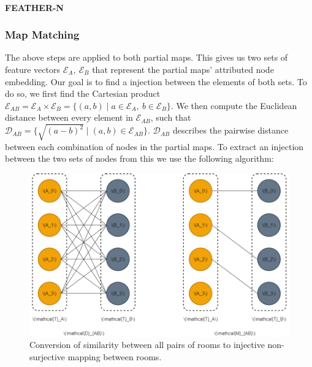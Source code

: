 \paragraph{FEATHER-N}

\subsubsection{Map Matching}

The above steps are applied to both partial maps. This gives us two sets of feature vectors \(\mathcal{E}_A,\ \mathcal{E}_B\) that represent the partial maps' attributed node embedding. Our goal is to find a injection between the elements of both sets. To do so, we first find the Cartesian product \(\mathcal{E}_{AB} = \mathcal{E}_A \times \mathcal{E}_B = \{(a,b) \mid a \in \mathcal{E}_A,\ b \in \mathcal{E}_B\}\). We then compute the Euclidean distance between every element in \(\mathcal{E}_{AB}\), such that \(\mathcal{D}_{AB} = \{\sqrt{(a - b)^2} \mid (a, b) \in \mathcal{E}_{AB}\}\). \(\mathcal{D}_{AB}\) describes the pairwise distance between each combination of nodes in the partial maps. To extract an injection between the two sets of nodes from this we use the following algorithm:

\begin{figure}[h]
    \centering
    \includegraphics*[width=\textwidth]{./fig/injunction.png}
    \caption{Conversion of similarity between all pairs of rooms to injective non-surjective mapping between rooms.}
    \label{fig:injunction}
\end{figure}

